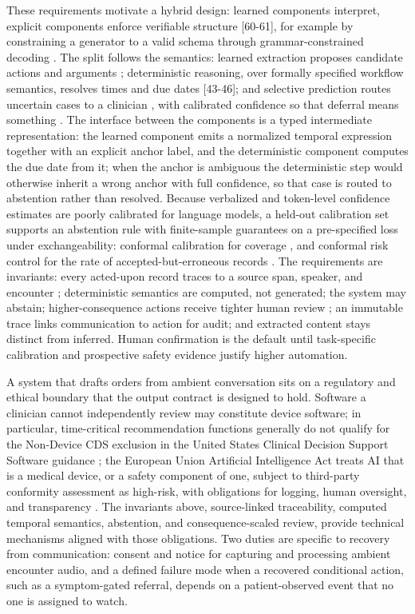\documentclass[3p,twocolumn]{elsarticle}
\begin{document}
These requirements motivate a hybrid design: learned components interpret, explicit components enforce verifiable structure {[}60-61{]}, for example by constraining a generator to a valid schema through grammar-constrained decoding \cite{ref62}. The split follows the semantics: learned extraction proposes candidate actions and arguments \cite{ref42}; deterministic reasoning, over formally specified workflow semantics, resolves times and due dates {[}43-46{]}; and selective prediction routes uncertain cases to a clinician \cite{ref63}, with calibrated confidence so that deferral means something \cite{ref64}. The interface between the components is a typed intermediate representation: the learned component emits a normalized temporal expression together with an explicit anchor label, and the deterministic component computes the due date from it; when the anchor is ambiguous the deterministic step would otherwise inherit a wrong anchor with full confidence, so that case is routed to abstention rather than resolved. Because verbalized and token-level confidence estimates are poorly calibrated for language models, a held-out calibration set supports an abstention rule with finite-sample guarantees on a pre-specified loss under exchangeability: conformal calibration for coverage \cite{ref65}, and conformal risk control for the rate of accepted-but-erroneous records \cite{ref66}. The requirements are invariants: every acted-upon record traces to a source span, speaker, and encounter \cite{ref49}; deterministic semantics are computed, not generated; the system may abstain; higher-consequence actions receive tighter human review \cite{ref67}; an immutable trace links communication to action for audit; and extracted content stays distinct from inferred. Human confirmation is the default until task-specific calibration and prospective safety evidence justify higher automation.

A system that drafts orders from ambient conversation sits on a regulatory and ethical boundary that the output contract is designed to hold. Software a clinician cannot independently review may constitute device software; in particular, time-critical recommendation functions generally do not qualify for the Non-Device CDS exclusion in the United States Clinical Decision Support Software guidance \cite{ref68}; the European Union Artificial Intelligence Act treats AI that is a medical device, or a safety component of one, subject to third-party conformity assessment as high-risk, with obligations for logging, human oversight, and transparency \cite{ref69}. The invariants above, source-linked traceability, computed temporal semantics, abstention, and consequence-scaled review, provide technical mechanisms aligned with those obligations. Two duties are specific to recovery from communication: consent and notice for capturing and processing ambient encounter audio, and a defined failure mode when a recovered conditional action, such as a symptom-gated referral, depends on a patient-observed event that no one is assigned to watch.
\end{document}
